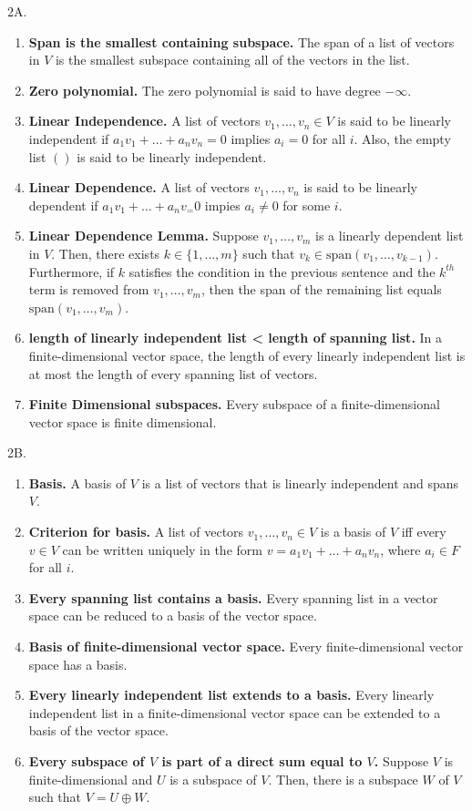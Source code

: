 \documentclass[12pt]{article}
\theoremstyle{definition}
\theoremstyle{named}
\begin{document}
2A. 
\begin{enumerate}
	\item \textbf{Span is the smallest containing subspace. } The span of a list of vectors in $V$ is the smallest subspace containing all of the vectors in the list. 
	\item \textbf{Zero polynomial. } The zero polynomial is said to have degree $-\infty$. 
	\item \textbf{Linear Independence. } A list of vectors $v_1,\dots,v_n \in V$ is said to be linearly independent if $a_1v_1 + \dots + a_nv_n = 0$ implies $a_i=0$ for all $i$. Also, the empty list $()$ is said to be linearly independent. 
	\item \textbf{Linear Dependence. } A list of vectors $v_1,\dots,v_n$ is said to be linearly dependent if $a_1v_1 + \dots + a_nv_=0$ impies $a_i \neq 0$ for some $i$. 
	\item \textbf{Linear Dependence Lemma. } Suppose $v_1,\dots,v_m$ is a linearly dependent list in $V$. Then, there exists $k \in \{1,\dots,m\}$ such that $v_k \in \textrm{span}(v_1,\dots,v_{k-1})$. Furthermore, if $k$ satisfies the condition in the previous sentence and the $k^{th}$ term is removed from $v_1,\dots,v_m$, then the span of the remaining list equals $\textrm{span}(v_1,\dots,v_m)$. 
	\item \textbf{length of linearly independent list < length of spanning list. } In a finite-dimensional vector space, the length of every linearly independent list is at most the length of every spanning list of vectors. 
	\item \textbf{Finite Dimensional subspaces. } Every subspace of a finite-dimensional vector space is finite dimensional. 
\end{enumerate}

2B. 
\begin{enumerate}
	\item \textbf{Basis. } A basis of $V$ is a list of vectors that is linearly independent and spans $V$. 
	\item \textbf{Criterion for basis. } A list of vectors $v_1,\dots,v_n \in V$ is a basis of $V$ iff every $v \in V$ can be written uniquely in the form $v=a_1v_1 + \dots + a_nv_n$, where $a_i \in F$ for all $i$. 
	\item \textbf{Every spanning list contains a basis. } Every spanning list in a vector space can be reduced to a basis of the vector space. 
	\item \textbf{Basis of finite-dimensional vector space. } Every finite-dimensional vector space has a basis. 
	\item \textbf{Every linearly independent list extends to a basis. } Every linearly independent list in a finite-dimensional vector space can be extended to a basis of the vector space. 
	\item \textbf{Every subspace of $V$ is part of a direct sum equal to $V$. } Suppose $V$ is finite-dimensional and $U$ is a subspace of $V$. Then, there is a subspace $W$ of $V$ such that $V = U \oplus W$. 
\end{enumerate}
\end{document}
